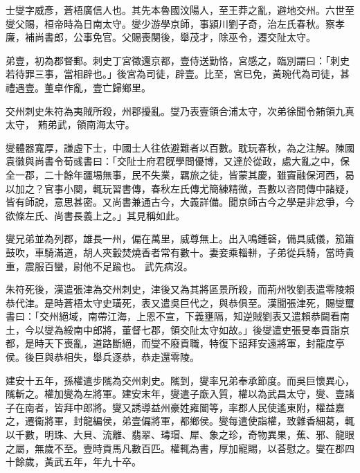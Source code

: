 \begin{pinyinscope}
 
 
 士燮字威彥，蒼梧廣信人也。其先本魯國汶陽人，至王莽之亂，避地交州。六世至燮父賜，桓帝時為日南太守。燮少游學京師，事潁川劉子奇，治左氏春秋。察孝廉，補尚書郎，公事免官。父賜喪闋後，舉茂才，除巫令，遷交阯太守。
 
 
 
 
 弟壹，初為郡督郵。刺史丁宮徵還京都，壹侍送勤恪，宮感之，臨別謂曰：「刺史若待罪三事，當相辟也。」後宮為司徒，辟壹。比至，宮已免，黃琬代為司徒，甚禮遇壹。董卓作亂，壹亡歸鄉里。
 
 
 交州刺史朱符為夷賊所殺，州郡擾亂。燮乃表壹領合浦太守，次弟徐聞令䵋領九真太守，
 䵋弟武，領南海太守。
 
 
 
 
 燮體器寬厚，謙虛下士，中國士人往依避難者以百數。耽玩春秋，為之注解。陳國袁徽與尚書令荀彧書曰：「交阯士府君旣學問優博，又達於從政，處大亂之中，保全一郡，二十餘年疆埸無事，民不失業，羈旅之徒，皆蒙其慶，雖竇融保河西，曷以加之？官事小闋，輒玩習書傳，春秋左氏傳尤簡練精微，吾數以咨問傳中諸疑，皆有師說，意思甚密。又尚書兼通古今，大義詳備。聞京師古今之學是非忿爭，今欲條左氏、尚書長義上之。」其見稱如此。
 
 
燮兄弟並為列郡，雄長一州，偏在萬里，威尊無上。出入鳴鍾磬，備具威儀，笳簫鼓吹，車騎滿道，胡人夾轂焚燒香者常有數十。妻妾乘輜軿，子弟從兵騎，當時貴重，震服百蠻，尉他不足踰也。
 武先病沒。
 
 
 
 
 朱符死後，漢遣張津為交州刺史，津後又為其將區景所殺，而荊州牧劉表遣零陵賴恭代津。是時蒼梧太守史璜死，表又遣吳巨代之，與恭俱至。漢聞張津死，賜燮璽書曰：「交州絕域，南帶江海，上恩不宣，下義壅隔，知逆賊劉表又遣賴恭闚看南土，今以燮為綏南中郎將，董督七郡，領交阯太守如故。」後燮遣吏張旻奉貢詣京都，是時天下喪亂，道路斷絕，而燮不廢貢職，特復下詔拜安遠將軍，封龍度亭侯。後巨與恭相失，舉兵逐恭，恭走還零陵。
 
 
 
 
 建安十五年，孫權遣步隲為交州刺史。隲到，燮率兄弟奉承節度。而吳巨懷異心，隲斬之。權加燮為左將軍。建安末年，燮遣子廞入質，權以為武昌太守，燮、壹諸子在南者，皆拜中郎將。燮又誘導益州豪姓雍闓等，率郡人民使遙東附，權益嘉之，遷衞將軍，封龍編侯，弟壹偏將軍，都鄉侯。燮每遣使詣權，致雜香細葛，輒以千數，明珠、大貝、流離、翡翠、瑇瑁、犀、象之珍，奇物異果，蕉、邪、龍眼之屬，無歲不至。壹時貢馬凡數百匹。權輒為書，厚加寵賜，以荅慰之。燮在郡四十餘歲，黃武五年，年九十卒。
 

\end{pinyinscope}
